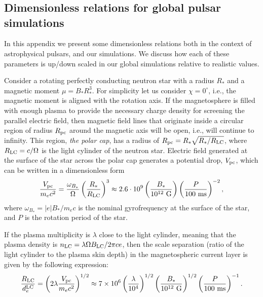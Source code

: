 \chapter{}
\section{Dimensionless relations for global pulsar simulations}
\label{appendix:psr-scalings}

In this appendix we present some dimensionless relations both in the context of astrophysical pulsars, and our simulations. We discuss how each of these parameters is up/down scaled in our global simulations relative to realistic values.

Consider a rotating perfectly conducting neutron star with a radius $R_*$ and a magnetic moment $\mu=B_* R_*^3$. For simplicity let us consider $\chi=0^\circ$, i.e., the magnetic moment is aligned with the rotation axis. If the magnetosphere is filled with enough plasma to provide the necessary charge density for screening the parallel electric field, then magnetic field lines that originate inside a circular region of radius $R_{\rm pc}$ around the magnetic axis will be open, i.e., will continue to infinity. This region, \emph{the polar cap}, has a radius of $R_{\rm pc} = R_*\sqrt{R_*/R_{\rm LC}}$, where $R_{\rm LC} = c/\Omega$ is the light cylinder of the neutron star. Electric field generated at the surface of the star across the polar cap generates a potential drop, $V_{\rm pc}$, which can be written in a dimensionless form
\begin{equation}
    \frac{V_{\rm pc}}{m_e c^2} = \frac{\omega_{B_*}}{\Omega}\left(\frac{R_*}{R_{\rm LC}}\right)^3\approx 2.6\cdot 10^{9}\left(\frac{B_*}{10^{12}~\textrm{G}}\right)\left(\frac{P}{100~\textrm{ms}}\right)^{-2},
\end{equation}
\noindent where $\omega_{B_*} = |e| B_* / m_e c$ is the nominal gyrofrequency at the surface of the star, and $P$ is the rotation period of the star. 

If the plasma multiplicity is $\lambda$ close to the light cylinder, meaning that the plasma density is $n_{\rm LC} = \lambda \Omega B_{\rm LC} / 2\pi c e$, then the scale separation (ratio of the light cylinder to the plasma skin depth) in the magnetospheric current layer is given by the following expression:
\begin{equation}
\label{eq:psr-scalesep}
    \frac{R_{\rm LC}}{d_e^{\rm LC}}=\left(2\lambda \frac{V_{\rm pc}}{m_e c^2}\right)^{1/2}\approx 7\times 10^{6}\left(\frac{\lambda}{10^4}\right)^{1/2}\left(\frac{B_*}{10^{12}~\textrm{G}}\right)^{1/2}\left(\frac{P}{100~\textrm{ms}}\right)^{-1}.
\end{equation}

